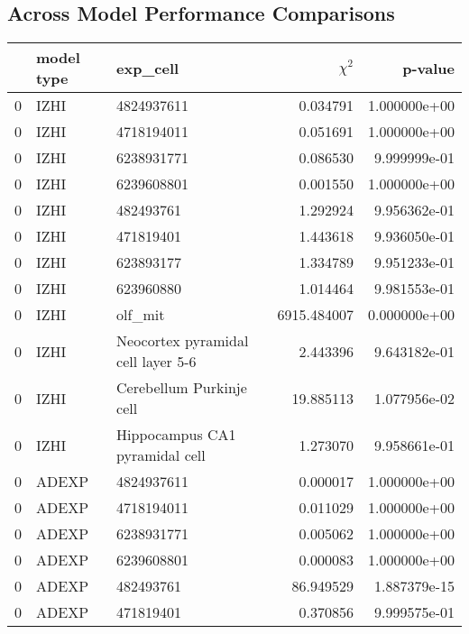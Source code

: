 \subsection{Across Model Performance Comparisons}
\begin{tabular}{lllrr}
\toprule
{} & model type &                            exp\_cell &   $\chi^{2}$ &       p-value \\
\midrule
0 &        IZHI &                          4824937611 &     0.034791 &  1.000000e+00 \\
0 &        IZHI &                          4718194011 &     0.051691 &  1.000000e+00 \\
0 &        IZHI &                          6238931771 &     0.086530 &  9.999999e-01 \\
0 &        IZHI &                          6239608801 &     0.001550 &  1.000000e+00 \\
0 &        IZHI &                           482493761 &     1.292924 &  9.956362e-01 \\
0 &        IZHI &                           471819401 &     1.443618 &  9.936050e-01 \\
0 &        IZHI &                           623893177 &     1.334789 &  9.951233e-01 \\
0 &        IZHI &                           623960880 &     1.014464 &  9.981553e-01 \\
0 &        IZHI &                             olf\_mit &  6915.484007 &  0.000000e+00 \\
0 &        IZHI &  Neocortex pyramidal cell layer 5-6 &     2.443396 &  9.643182e-01 \\
0 &        IZHI &            Cerebellum Purkinje cell &    19.885113 &  1.077956e-02 \\
0 &        IZHI &      Hippocampus CA1 pyramidal cell &     1.273070 &  9.958661e-01 \\
0 &       ADEXP &                          4824937611 &     0.000017 &  1.000000e+00 \\
0 &       ADEXP &                          4718194011 &     0.011029 &  1.000000e+00 \\
0 &       ADEXP &                          6238931771 &     0.005062 &  1.000000e+00 \\
0 &       ADEXP &                          6239608801 &     0.000083 &  1.000000e+00 \\
0 &       ADEXP &                           482493761 &    86.949529 &  1.887379e-15 \\
0 &       ADEXP &                           471819401 &     0.370856 &  9.999575e-01 \\

\end{tabular}
